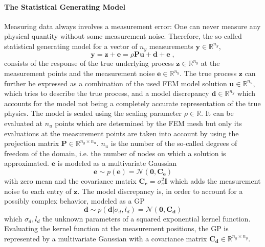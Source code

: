 \documentclass[%
  a4paper,oneside,%
  11pt,%
  smallchapters,
  style=printdev,
  extramargin,
  green,%
  rgb, <cmyk>
  ]{tubsbook}
\begin{document}
\paragraph{The Statistical Generating Model}
Measuring data always involves a measurement error: One can never measure any physical quantity without some measurement noise. Therefore, the so-called statistical generating model \cite{girolami2021,kennedy2001} for a vector of $n_y$ measurements $\bm{y} \in \mathbb{R}^{n_y}$, 
%
\begin{equation}
\bm{y} = \bm{z} + \bm{e} = \rho \bm{P} \bm{u} + \bm{d} + \bm{e} \; ,
\label{eqn:statGen}
\end{equation}
%
consists of the response of the true underlying process $\bm{z} \in \mathbb{R}^{n_y}$ at the measurement points and the measurement noise $\bm{e} \in \mathbb{R}^{n_y}$. The true process $\bm{z}$ can further be expressed as a combination of the used FEM model solution $\bm{u} \in \mathbb{R}^{n_u}$, which tries to describe the true process, and a model discrepancy $\bm{d} \in \mathbb{R}^{n_y}$ which accounts for the model not being a completely accurate representation of the true physics. The model is scaled using the scaling parameter $\rho \in \mathbb{R}$. It can be evaluated at $n_u$ points which are determined by the FEM mesh but only its evaluations at the measurement points are taken into account by using the projection matrix $\bm{P} \in \mathbb{R}^{n_y \times n_u}$. $n_u$ is the number of the so-called degrees of freedom of the domain, i.e. the number of nodes on which a solution is approximated.
%
$\bm{e}$ is modeled as a multivariate Gaussian 
%
\begin{equation}
\bm{e} \sim p(\bm{e}) = \mathcal{N}(\bm{0}, \bm{C_e})
\label{eqn:GeneratingNoise}
\end{equation}
with zero mean and the covariance matrix $\bm{C_e} = \sigma_e^2 \bm{I}$ which adds the measurement noise to each entry of $\bm{z}$.
%
The model discrepancy is, in order to account for a possibly complex behavior, modeled as a GP
\begin{equation}
\bm{d} \sim p(\bm{d} | \sigma_d, l_d) = \mathcal{N}(\bm{0},\bm{C_d})
\end{equation}
which $\sigma_d, l_d$ the unknown parameters of a squared exponential kernel function. Evaluating the kernel function at the measurement positions, the GP is represented by a multivariate Gaussian with a covariance matrix $\bm{C_d} \in \mathbb{R}^{n_y \times n_y}$.
\end{document}
